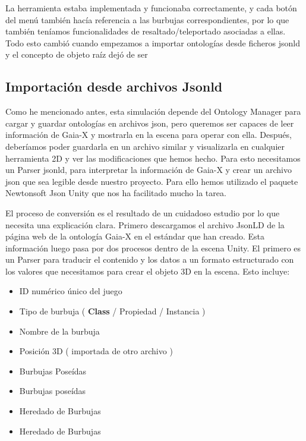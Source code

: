 La herramienta estaba implementada y funcionaba correctamente, y cada botón del menú también hacía referencia a las burbujas correspondientes, por lo que también teníamos funcionalidades de resaltado/teleportado asociadas a ellas. Todo esto cambió cuando empezamos a importar ontologías desde ficheros jsonld y el concepto de objeto raíz dejó de ser

\subsection{Importación desde archivos Jsonld}

Como he mencionado antes, esta simulación depende del Ontology Manager para cargar y guardar ontologías en archivos json, pero queremos ser capaces de leer información de Gaia-X y mostrarla en la escena para operar con ella. Después, deberíamos poder guardarla en un archivo similar y visualizarla en cualquier herramienta 2D y ver las modificaciones que hemos hecho.
Para esto necesitamos un Parser jsonld, para interpretar la información de Gaia-X y crear un archivo json que sea legible desde nuestro proyecto. Para ello hemos utilizado el paquete Newtonsoft Json Unity que nos ha facilitado mucho la tarea. \cite[]{json} 

El proceso de conversión es el resultado de un cuidadoso estudio por lo que necesita una explicación clara.
Primero descargamos el archivo JsonLD de la página web de la ontología Gaia-X en el estándar que han creado. Esta información luego pasa por dos procesos dentro de la escena Unity. El primero es un Parser para traducir el contenido y los datos a un formato estructurado con los valores que necesitamos para crear el objeto 3D en la escena. Esto incluye:

\begin{itemize}
   \item ID numérico único del juego
   \item Tipo de burbuja ( \textbf{Class} / Propiedad / Instancia )
   \item Nombre de la burbuja
   \item Posición 3D ( importada de otro archivo )
   \item Burbujas Poseídas
   \item Burbujas poseídas
   \item Heredado de Burbujas
   \item Heredado de Burbujas
\end{itemize}

